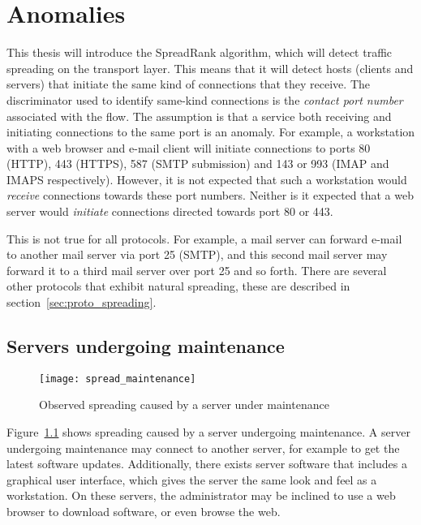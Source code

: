 \chapter{Anomalies}
\label{chp:anomalies}


This thesis will introduce the SpreadRank algorithm,
 which will detect traffic \gls{spreading} on the \gls{transport layer}.
This means that it will detect hosts (clients and servers) that initiate the same kind of connections that they receive.
The discriminator used to identify same-kind connections is the \emph{\gls{contact port} number} associated with the flow.
The assumption is that a \gls{service} both receiving and initiating connections to the same port is an anomaly.
For example, a workstation with a web browser and e-mail client will initiate connections to ports 80 (HTTP), 443 (HTTPS), 587 (SMTP submission) and 143 or 993 (IMAP and IMAPS respectively).
However, it is not expected that such a workstation would \emph{receive} connections towards these port numbers.
Neither is it expected that a web server would \emph{initiate} connections directed towards port 80 or 443.

This is not true for all protocols.
For example, a mail server can forward e-mail to another mail server via port 25 (SMTP),
 and this second mail server may forward it to a third mail server over port 25 and so forth.
There are several other protocols that exhibit natural \gls{spreading}, these are described in section~\ref{sec:proto_spreading}.



\section{Servers undergoing maintenance}
\begin{figure}[h]
	\caption{Observed spreading caused by a server under maintenance}
	\label{fig:spread_maintenance}
	\centering
		\texttt{[image: spread\_maintenance]}
\end{figure}
Figure~\ref{fig:spread_maintenance} shows \gls{spreading} caused by a server undergoing maintenance.
A server undergoing maintenance may connect to another server,
 for example to get the latest software updates.
Additionally, there exists server software that includes a graphical user interface,
 which gives the server the same look and feel as a workstation.
On these servers, the administrator may be inclined to use a web browser to download software, or even browse the web.


